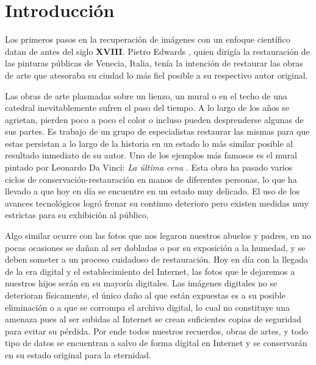 \chapter*{Introducción}\label{chapter:introduction}

\qquad

Los primeros pasos en la recuperaci\'on de imágenes con un enfoque científico datan de antes del siglo \textbf{XVIII}. Pietro Edwards \cite{itwiki:PE}, quien dirigía la restauraci\'on de las pinturas p\'ublicas de Venecia, Italia, ten\'ia la intenci\'on de restaurar las obras de arte que atesoraba su ciudad lo m\'as fiel posible a su respectivo autor original.

Las obras de arte plasmadas sobre un lienzo, un mural o en el techo de una catedral inevitablemente sufren el paso del tiempo. A lo largo de los años se agrietan, pierden poco a poco el color o incluso pueden desprenderse algunas de sus partes. Es trabajo de un grupo de especialistas restaurar las mismas para que estas persistan a lo largo de la historia en un estado lo m\'as similar posible al resultado inmediato de su autor. Uno de los ejemplos m\'as famosos es el mural pintado por Leonardo Da Vinci: \textit{La \'ultima cena} \cite{wiki:CR-TLS}. Esta obra ha pasado varios ciclos de conservaci\'on-restauraci\'on en manos de diferentes personas, lo que ha llevado a que hoy en d\'ia se encuentre en un estado muy delicado. El uso de los avances tecnológicos logr\'o frenar su continuo deterioro pero existen medidas muy estrictas para su exhibición al p\'ublico.

Algo similar ocurre con las fotos que nos legaron nuestros abuelos y padres, en no pocas ocasiones se dañan al ser dobladas o por su exposici\'on a la humedad, y se deben someter a un proceso cuidadoso de restauraci\'on. Hoy en d\'ia con la llegada de la era digital y el establecimiento del Internet, las fotos que le dejaremos a nuestros hijos ser\'an en su mayor\'ia digitales. Las im\'agenes digitales no se deterioran físicamente, el \'unico daño al que est\'an expuestas es a su posible eliminaci\'on o a que se corrompa el archivo digital, lo cual no constituye una amenaza pues al ser subidas al Internet se crean suficientes copias de seguridad para evitar su p\'erdida. Por ende todos nuestros recuerdos, obras de artes, y todo tipo de datos se encuentran a salvo de forma digital en Internet y se conservar\'an en su estado original para la eternidad.

